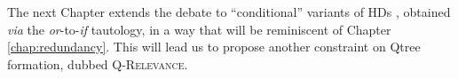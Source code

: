 The next Chapter extends the debate to ``conditional'' variants of HDs \citep{Mandelkern2018,Kalomoiros2024}, obtained \textit{via} the \textit{or}-to-\textit{if} tautology, in a way that will be reminiscent of Chapter \ref{chap:redundancy}. This will lead us to propose another constraint on Qtree formation, dubbed \textsc{Q-Relevance}.






